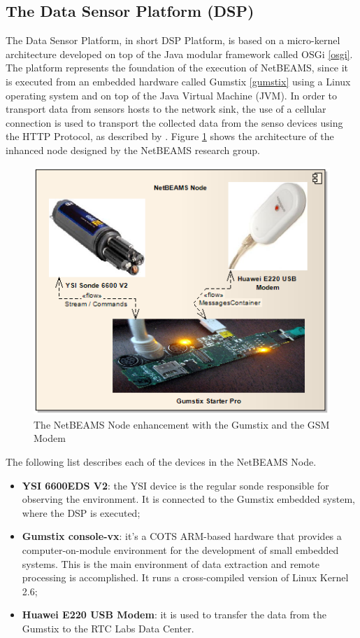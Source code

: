 \subsection{The Data Sensor Platform (DSP)}

The Data Sensor Platform, in short DSP Platform, is based on a micro-kernel
architecture developed on top of the Java modular framework called OSGi
\ref{osgi}. The platform represents the foundation of the execution of
NetBEAMS, since it is executed from an embedded hardware called Gumstix
\ref{gumstix} using a Linux operating system and on top of the Java Virtual
Machine (JVM). In order to transport data from sensors hosts to the network
sink, the use of a cellular connection is used to transport the collected data
from the senso devices using the HTTP Protocol, as described by
\cite{netbeams09}. Figure \ref{fig:sf-netbeams-node} shows the
architecture of the inhanced node designed by the NetBEAMS research group.

\begin{figure}
  \centering
  \includegraphics{../diagrams/DSP-Gateway-Node}
  \caption{The NetBEAMS Node enhancement with the Gumstix and the GSM Modem}
  \label{fig:sf-netbeams-node}
\end{figure}

The following list describes each of the devices in the NetBEAMS Node.

\begin{itemize}
  \item \textbf{YSI 6600EDS V2}: the YSI device is the regular sonde
  responsible for observing the environment. It is connected to the Gumstix
  embedded system, where the DSP is executed;
  \item \textbf{Gumstix console-vx}: it's a COTS ARM-based hardware that
  provides a computer-on-module environment for the development of small
  embedded systems. This is the main environment of data extraction and remote
  processing is accomplished. It runs a cross-compiled version of Linux Kernel
  2.6;
  \item \textbf{Huawei E220 USB Modem}: it is used to transfer the data from the
  Gumstix to the RTC Labs Data Center.
\end{itemize} 

